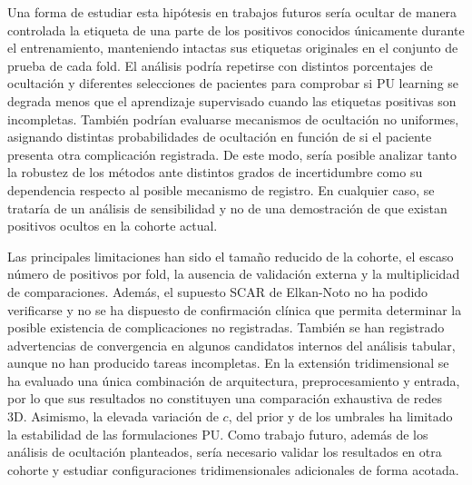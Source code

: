 Una forma de estudiar esta hipótesis en trabajos futuros sería ocultar de manera controlada la etiqueta de una parte de los positivos conocidos únicamente durante el entrenamiento, manteniendo intactas sus etiquetas originales en el conjunto de prueba de cada fold. El análisis podría repetirse con distintos porcentajes de ocultación y diferentes selecciones de pacientes para comprobar si PU learning se degrada menos que el aprendizaje supervisado cuando las etiquetas positivas son incompletas. También podrían evaluarse mecanismos de ocultación no uniformes, asignando distintas probabilidades de ocultación en función de si el paciente presenta otra complicación registrada. De este modo, sería posible analizar tanto la robustez de los métodos ante distintos grados de incertidumbre como su dependencia respecto al posible mecanismo de registro. En cualquier caso, se trataría de un análisis de sensibilidad y no de una demostración de que existan positivos ocultos en la cohorte actual.

Las principales limitaciones han sido el tamaño reducido de la cohorte, el escaso número de positivos por fold, la ausencia de validación externa y la multiplicidad de comparaciones. Además, el supuesto SCAR de Elkan-Noto no ha podido verificarse y no se ha dispuesto de confirmación clínica que permita determinar la posible existencia de complicaciones no registradas. También se han registrado advertencias de convergencia en algunos candidatos internos del análisis tabular, aunque no han producido tareas incompletas. En la extensión tridimensional se ha evaluado una única combinación de arquitectura, preprocesamiento y entrada, por lo que sus resultados no constituyen una comparación exhaustiva de redes 3D. Asimismo, la elevada variación de \(c\), del prior y de los umbrales ha limitado la estabilidad de las formulaciones PU. Como trabajo futuro, además de los análisis de ocultación planteados, sería necesario validar los resultados en otra cohorte y estudiar configuraciones tridimensionales adicionales de forma acotada.
